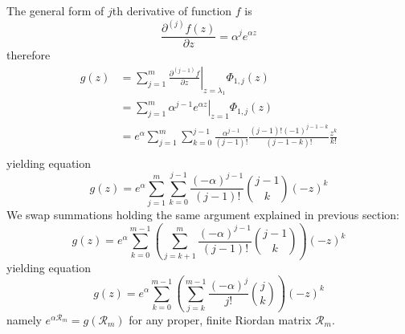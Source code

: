 The general form of $j$th derivative of function $f$ is 
$$\frac{\partial^{(j)}{f}(z)}{\partial{z}} = \alpha^{j} e^{\alpha z}$$ 
therefore
\begin{displaymath}
\begin{split}
  g(z) &= \sum_{j=1}^{m}{ \left. \frac{\partial^{(j-1)}{f}}{\partial{z}} \right|_{z=\lambda_{1}}\Phi_{1,j}(z)} \\
       &= \sum_{j=1}^{m}{ \left. \alpha^{j-1} e^{\alpha z} \right|_{z=1}\Phi_{1,j}(z)} \\
       &= e^{\alpha}\sum_{j=1}^{m}{\sum_{k=0}^{j-1}{\frac{\alpha^{j-1}}{(j-1)!}  \frac{(j-1)!(-1)^{j-1-k}}{(j-1-k)!}\frac{z^{k}}{k!}}}\\
\end{split}
\end{displaymath}
yielding equation
\begin{equation}
  g(z) = e^{\alpha}\sum_{j=1}^{m}{\sum_{k=0}^{j-1}{\frac{(-\alpha)^{j-1}}{(j-1)!}{{j-1}\choose{k}}(-z)^{k}}} 
\end{equation}
We swap summations holding the same argument explained in previous section:
\begin{displaymath}
  g(z) = e^{\alpha}\sum_{k=0}^{m-1}{\left(\sum_{j=k+1}^{m}{\frac{(-\alpha)^{j-1}}{(j-1)!}{{j-1}\choose{k}}}\right)(-z)^{k}}
\end{displaymath}
yielding equation
\begin{equation}
  g(z) = e^{\alpha}\sum_{k=0}^{m-1}{\left(\sum_{j=k}^{m-1}{\frac{(-\alpha)^{j}}{j!}{{j}\choose{k}}}\right)(-z)^{k}}
\end{equation}
namely $e^{\alpha\mathcal{R}_{m}}=g(\mathcal{R}_{m})$ for any proper, 
finite Riordan matrix $\mathcal{R}_{m}$.


